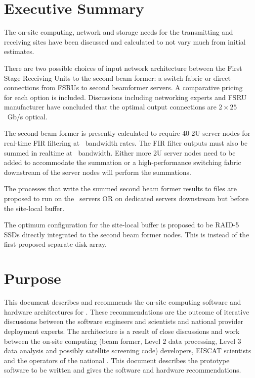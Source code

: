 \documentclass[12pt,a4paper]{article}
\begin{document}
\newpage
\tableofcontents
\newpage


\section{Executive Summary}
\label{exec-summ}

The on-site computing, network and storage needs for the \ED transmitting and receiving sites have been discussed and calculated to not vary much from initial estimates.

There are two possible choices of input network architecture between the First Stage Receiving Units to the second beam former: a switch fabric or direct connections from FSRUs to second beamformer servers. A comparative pricing for each option is included.
Discussions including networking experts and FSRU manufacturer have concluded that the optimal output connections are $2 \times 25$~Gb/s optical. 

The second beam former is presently calculated to require 40 2U server nodes for real-time FIR filtering at \NBW\ bandwidth rates.
The FIR filter outputs must also be summed in realtime at \NBW\ bandwidth.
Either more 2U server nodes need to be added to accommodate the summation or a high-performance switching fabric downstream of the server nodes will perform the summations.

The processes that write the summed second beam former results to files are proposed to run on the \SBF\ servers OR on dedicated servers downstream but before the site-local buffer.

The optimum configuration for the site-local buffer is proposed to be RAID-5 SSDs directly integrated to the second beam former nodes.
This is instead of the first-proposed separate disk array.

\section{Purpose}
\label{purpose}
This document describes and recommends the on-site computing software and hardware architectures for \ED. 
These recommendations are the outcome of iterative discussions between the \ED software engineers and scientists and national provider deployment experts. 
The architecture is a result of close discussions and work between the on-site computing (beam former, Level 2 data processing, Level 3 data analysis and possibly satellite screening code) developers, EISCAT scientists and the operators of the national \einfras.
This document describes the prototype software to be written and gives the software and hardware recommendations.
\end{document}
